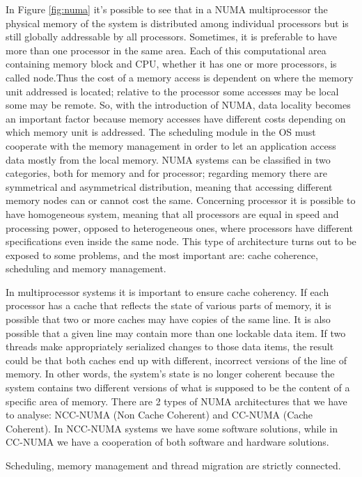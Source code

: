 \documentclass[a4paper,10pt]{article}
\begin{document}
\begin{multicols}{2}
In Figure \ref{fig:numa} it's possible to see that in a NUMA multiprocessor the physical memory of the system is distributed among individual processors but is still globally addressable by all processors. Sometimes, it is preferable to have more than one processor in the same area. Each of this computational area containing memory block and CPU, whether it has one or more processors, is called node.Thus the cost of a memory access is dependent on where the memory unit addressed is located; relative to the processor some accesses may be local some may be remote. So, with the introduction of NUMA, data locality becomes an important factor because memory accesses have different costs depending on which memory unit is addressed. The scheduling module in the OS must cooperate with the memory management in order to let an application access data mostly from the local memory. NUMA systems can be classified in two categories, both for memory and for processor; regarding memory there are symmetrical and asymmetrical distribution, meaning that accessing different memory nodes can or cannot cost the same. Concerning processor it is possible to have homogeneous system, meaning that all processors are equal in speed and processing power, opposed to heterogeneous ones, where processors have different specifications even inside the same node. This type of architecture turns out to be exposed to some problems, and the most important are: cache coherence, scheduling and memory management.\par
\parindent 10mm In multiprocessor systems it is important to ensure cache coherency. If each processor has a cache that reflects the state of various parts of memory, it is possible that two or more caches may have copies of the same line. It is also possible that a given line may contain more than one lockable data item. If two threads make appropriately serialized changes to those data items, the result could be that both caches end up with different, incorrect versions of the line of memory. In other words, the system's state is no longer coherent because the system contains two different versions of what is supposed to be the content of a specific area of memory. There are 2 types of NUMA architectures that we have to analyse: NCC-NUMA (Non Cache Coherent) and CC-NUMA (Cache Coherent). In NCC-NUMA systems we have some software solutions, while in CC-NUMA we have a cooperation of both software and hardware solutions.\par 
\parindent 10mm Scheduling, memory management and thread migration are strictly connected.\\

\end{multicols}
\end{document}

